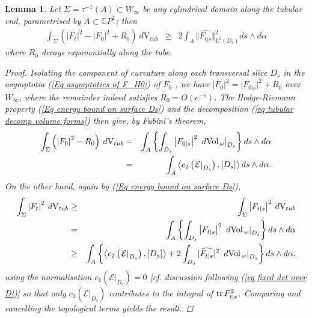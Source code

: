 \documentclass{article}
\newcommand{\func}[1]{\textnormal {#1\,}}
\newcommand{\dvol}{\:d\func{Vol}_\omega}
\newcommand{\dvtub}{\:d\text{V}_{tub}}
\newcommand{\mc}[1]{\mathcal{#1}}
\newtheorem{lemma}[theorem]{Lemma}
\begin{document}
\begin{lemma}   \label{lemma Energy on cylindrical domain}
Let $\Sigma=\tau^{-1}(A)\subset W_\infty$ be any cylindrical domain along the tubular end, parametrised by $A\subset\mathbb{C}P^{1} $; then
\begin{eqnarray*}
        \int_{\Sigma} \left(\left\vert F_t\right\vert^2
        - \left\vert F_0 \right\vert^2 +R_0\right) 
        \dvtub         
        &\geq&
        2\int_{A} \Vert \widehat{F_{t \vert s}} \Vert^2_{L^2(D_s)}
        ds\wedge d\alpha 
\end{eqnarray*}
where $R_0$ decays exponentially along the tube. 
\begin{proof}
Isolating the component of curvature along each transversal slice $D_s$ in the asymptotia (\ref{Eq asymptotics of F_H0}) of $F_{0}$ , we have $\left\vert F_0 \right\vert^2 =\vert F_{0\vert s} \vert^2+R_{0}$ over $W_\infty$, where the remainder indeed satisfies $R_0 = O\left(e^{-s}\right)$. The Hodge-Riemann property  (\ref{Eq energy bound on surface Ds}) and the decomposition (\ref{eq tubular decomp volume forms}) then give, by Fubini's theorem,
\begin{eqnarray*}
        \int_{\Sigma} \left(\left\vert F_0 \right\vert^2 -R_0 \right)
        \dvtub
        &=& \int_{A} \left\{\int_{D_{s}}\left\vert F_{0\vert s} \right\vert^2
        \left.\dvol\right\vert_{D_s}\right\} ds\wedge d\alpha \\
        &=& \int_{A} \left\langle c_2\left( \left.\mc{E}\right\vert_{D_s}\right),\left[ D_s \right]\right\rangle
        ds\wedge d\alpha.        
\end{eqnarray*}
On the other hand, again by (\ref{Eq energy bound on surface Ds}), 
\begin{eqnarray*}
        \int_{\Sigma } \left\vert F_t \right\vert^2 
        \dvtub
        & \geq& \int_{\Sigma } \left\vert F_{t\vert s} \right\vert^2
        \dvtub\\
        &= &\int_{A} \left\{\int_{D_s} \left\vert F_{t\vert s}\right\vert^2
        {\left.\dvol\right\vert_{D_s}}\right\} ds\wedge d\alpha \\
        &\geq &\int_{A}\left\{ \left\langle c_2 \left( \left.\mathcal{E}\right\vert_{D_s}         \right),\left[ D_s \right]\right\rangle 
        +2 \int_{D_s}\vert \widehat{F_{t\vert s}} \vert^2 \left.\dvol\right\vert_{D_s}         \right\} ds\wedge d\alpha,
\end{eqnarray*}
using the normalisation $c_1(\left.\mathcal{E}\right\vert_{D_s})=0$ [cf. discussion following (\ref{eq fixed det over D})] so that only $c_2 \left( \left.\mathcal{E}\right\vert_{D_s}\right)$ contributes to the integral of $\func{tr}F_{t\vert s}^{2}$. Comparing and cancelling the topological terms yields the result.\end{proof}
\end{lemma}
\end{document}
